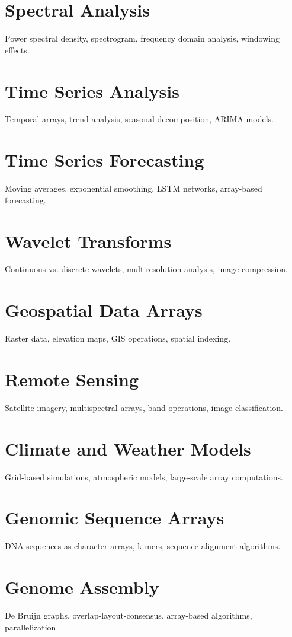 \chapter{Spectral Analysis}
Power spectral density, spectrogram, frequency domain analysis, windowing effects.

\chapter{Time Series Analysis}
Temporal arrays, trend analysis, seasonal decomposition, ARIMA models.

\chapter{Time Series Forecasting}
Moving averages, exponential smoothing, LSTM networks, array-based forecasting.

\chapter{Wavelet Transforms}
Continuous vs. discrete wavelets, multiresolution analysis, image compression.


\chapter{Geospatial Data Arrays}
Raster data, elevation maps, GIS operations, spatial indexing.

\chapter{Remote Sensing}
Satellite imagery, multispectral arrays, band operations, image classification.

\chapter{Climate and Weather Models}
Grid-based simulations, atmospheric models, large-scale array computations.

\chapter{Genomic Sequence Arrays}
DNA sequences as character arrays, k-mers, sequence alignment algorithms.

\chapter{Genome Assembly}
De Bruijn graphs, overlap-layout-consensus, array-based algorithms, parallelization.

